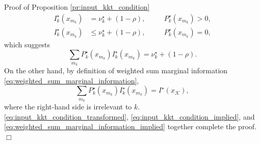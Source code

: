 \documentclass[journal]{IEEEtran}
\renewcommand{\qedsymbol}{\hfill\ensuremath{\Box}}
\begin{document}
\begin{appendix}
\begin{subsection}{Proof of Proposition \ref{pr:input_kkt_condition}}
		\begin{subequations}
			\label{eq:input_kkt_condition_transformed}
			\begin{alignat}{2}
				I_k^\star(x_{m_k}) & = \nu_k^\star + (1 - \rho), \quad   &  & P_k^\star(x_{m_k}) > 0,\label{eq:probable_states_marginal} \\
				I_k^\star(x_{m_k}) & \le \nu_k^\star + (1 - \rho), \quad &  & P_k^\star(x_{m_k}) = 0,\label{eq:dropped_states_marginal}
			\end{alignat}
		\end{subequations}
		which suggests
		\begin{equation}
			\sum_{m_k} P_k^\star(x_{m_k}) I_k^\star(x_{m_k}) = \nu_k^\star + (1 - \rho).
			\label{eq:input_kkt_condition_implied}
		\end{equation}
		On the other hand, by definition of weighted sum marginal information \eqref{eq:weighted_sum_marginal_information},
		\begin{equation}
			\sum_{m_k} P_k^\star(x_{m_k}) I_k^\star(x_{m_k}) = I^\star(x_{\mathcal{K}}),
			\label{eq:weighted_sum_marginal_information_implied}
		\end{equation}
		where the right-hand side is irrelevant to $k$.
		\eqref{eq:input_kkt_condition_transformed}, \eqref{eq:input_kkt_condition_implied}, and \eqref{eq:weighted_sum_marginal_information_implied} together complete the proof.
		\qedsymbol
		\label{ap:input_kkt_condition}
	\end{subsection}


\end{appendix}
\end{document}
